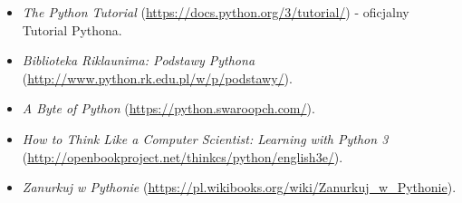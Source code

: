 % 
% 
% 
% 

\begin{itemize}
\item \emph{The Python Tutorial} (\url{https://docs.python.org/3/tutorial/}) - oficjalny Tutorial Pythona.
\item \emph{Biblioteka Riklaunima: Podstawy Pythona} (\url{http://www.python.rk.edu.pl/w/p/podstawy/}).
\item \emph{A Byte of Python} (\url{https://python.swaroopch.com/}).
\item \emph{How to Think Like a Computer Scientist: Learning with Python 3} (\url{http://openbookproject.net/thinkcs/python/english3e/}).
\item \emph{Zanurkuj w Pythonie} (\url{https://pl.wikibooks.org/wiki/Zanurkuj_w_Pythonie}).
\end{itemize}
